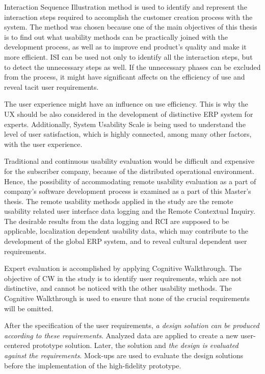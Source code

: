 \documentclass[12pt,a4paper,oneside,pdftex]{report}
\begin{document}
Interaction Sequence Illustration method is used to identify and represent the interaction steps required to accomplish the customer creation process with the system. The method was chosen because one of the main objectives of this thesis is to find out what usability methods can be practically joined with the development process, as well as to improve end product's quality and make it more efficient. ISI can be used not only to identify all the interaction steps, but to detect the unnecessary steps as well. If the unnecessary phases can be excluded from the process, it might have significant affects on the efficiency of use and reveal tacit user requirements. 

The user experience might have an influence on use efficiency. This is why the UX should be also considered in the development of distinctive ERP system for experts. Additionally, System Usability Scale is being used to understand the level of user satisfaction, which is highly connected, among many other factors, with the user experience.

Traditional and continuous usability evaluation would be difficult and expensive for the subscriber company, because of the distributed operational environment. Hence, the possibility of accommodating remote usability evaluation as a part of company's software development process is examined as a part of this Master's thesis. The remote usability methods applied in the study are the remote usability related user interface data logging and the Remote Contextual Inquiry. The desirable results from the data logging and RCI are supposed to be applicable, localization dependent usability data, which may contribute to the development of the global ERP system, and to reveal cultural dependent user requirements. 

Expert evaluation is accomplished by applying Cognitive Walkthrough. The objective of CW in the study is to identify user requirements, which are not distinctive, and cannot be noticed with the other usability methods. The Cognitive Walkthrough is used to ensure that none of the crucial requirements will be omitted.

After the specification of the user requirements, \emph{a design solution can be produced according to these requirements}. Analyzed data are applied to create a new user-centered prototype solution. Later, the solution and \emph{the design is evaluated against the requirements}. Mock-ups are used to evaluate the design solutions before the implementation of the high-fidelity prototype.
\end{document}

